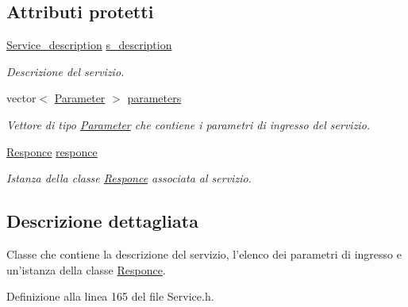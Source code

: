 \subsection*{Attributi protetti}
\begin{DoxyCompactItemize}
\item 
\hypertarget{class_service_a55e991ff18c0dceca202388a771283dc}{\hyperlink{struct_service__description}{Service\-\_\-description} \hyperlink{class_service_a55e991ff18c0dceca202388a771283dc}{s\-\_\-description}}\label{class_service_a55e991ff18c0dceca202388a771283dc}

\begin{DoxyCompactList}\small\item\em Descrizione del servizio. \end{DoxyCompactList}\item 
\hypertarget{class_service_a92a0bf45e91da701d22152651d3c7907}{vector$<$ \hyperlink{struct_parameter}{Parameter} $>$ \hyperlink{class_service_a92a0bf45e91da701d22152651d3c7907}{parameters}}\label{class_service_a92a0bf45e91da701d22152651d3c7907}

\begin{DoxyCompactList}\small\item\em Vettore di tipo {\ttfamily \hyperlink{struct_parameter}{Parameter}} che contiene i parametri di ingresso del servizio. \end{DoxyCompactList}\item 
\hypertarget{class_service_af32489d66225d9cc691e68d1af386e9e}{\hyperlink{class_responce}{Responce} \hyperlink{class_service_af32489d66225d9cc691e68d1af386e9e}{responce}}\label{class_service_af32489d66225d9cc691e68d1af386e9e}

\begin{DoxyCompactList}\small\item\em Istanza della classe {\itshape \hyperlink{class_responce}{Responce}} associata al servizio. \end{DoxyCompactList}\end{DoxyCompactItemize}


\subsection{Descrizione dettagliata}
Classe che contiene la descrizione del servizio, l'elenco dei parametri di ingresso e un'istanza della classe {\ttfamily \hyperlink{class_responce}{Responce}}. 

Definizione alla linea 165 del file Service.\-h.



